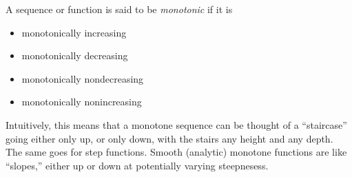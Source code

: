 \documentclass[12pt]{article}
\begin{document}
A sequence or function is said to be \emph{monotonic} if it is 

\begin{itemize}
\item monotonically increasing
\item monotonically decreasing
\item monotonically nondecreasing
\item monotonically nonincreasing
\end{itemize}

Intuitively, this means that a monotone sequence can be thought of a ``staircase'' going either only up, or only down, with the stairs any height and any depth.  The same goes for step functions.  Smooth (analytic) monotone functions are like ``slopes,'' either up or down at potentially varying steepnesess.
\end{document}
